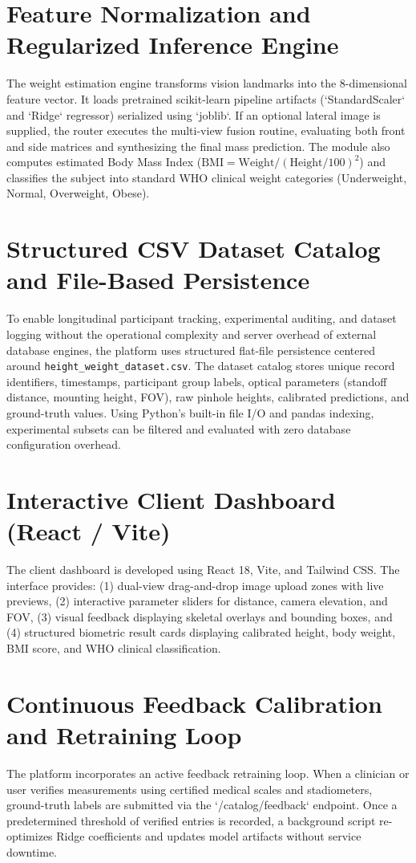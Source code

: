\documentclass[12pt,a4paper,oneside]{report}
\begin{document}
\section{Feature Normalization and Regularized Inference Engine}
The weight estimation engine transforms vision landmarks into the 8-dimensional feature vector. It loads pretrained scikit-learn pipeline artifacts (`StandardScaler` and `Ridge` regressor) serialized using `joblib`. If an optional lateral image is supplied, the router executes the multi-view fusion routine, evaluating both front and side matrices and synthesizing the final mass prediction. The module also computes estimated Body Mass Index ($\text{BMI} = \text{Weight} / (\text{Height} / 100)^2$) and classifies the subject into standard WHO clinical weight categories (Underweight, Normal, Overweight, Obese).

\section{Structured CSV Dataset Catalog and File-Based Persistence}
To enable longitudinal participant tracking, experimental auditing, and dataset logging without the operational complexity and server overhead of external database engines, the platform uses structured flat-file persistence centered around \texttt{height\_weight\_dataset.csv}. The dataset catalog stores unique record identifiers, timestamps, participant group labels, optical parameters (standoff distance, mounting height, FOV), raw pinhole heights, calibrated predictions, and ground-truth values. Using Python's built-in file I/O and pandas indexing, experimental subsets can be filtered and evaluated with zero database configuration overhead.

\section{Interactive Client Dashboard (React / Vite)}
The client dashboard is developed using React 18, Vite, and Tailwind CSS. The interface provides: (1) dual-view drag-and-drop image upload zones with live previews, (2) interactive parameter sliders for distance, camera elevation, and FOV, (3) visual feedback displaying skeletal overlays and bounding boxes, and (4) structured biometric result cards displaying calibrated height, body weight, BMI score, and WHO clinical classification.

\section{Continuous Feedback Calibration and Retraining Loop}
The platform incorporates an active feedback retraining loop. When a clinician or user verifies measurements using certified medical scales and stadiometers, ground-truth labels are submitted via the `/catalog/feedback` endpoint. Once a predetermined threshold of verified entries is recorded, a background script re-optimizes Ridge coefficients and updates model artifacts without service downtime.
\end{document}
